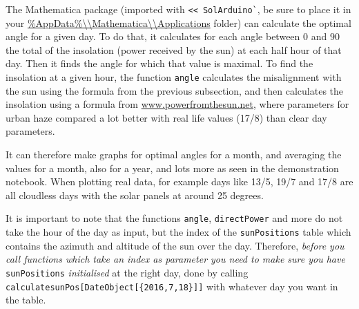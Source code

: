 \documentclass{article}
\begin{document}
			   The Mathematica package (imported with \verb|<< SolArduino`|, be sure to place it in your
			    \url{\%AppData\%\\Mathematica\\Applications} folder) can calculate the optimal angle for a given day.
			    To do that, it calculates for each angle between $0$ and $90$ the total of the insolation (power received by the sun) at each half hour of that day.
			    Then it finds the angle for which that value is maximal.
			    To find the insolation at a given hour, the function \verb|angle| calculates the misalignment with the sun using the formula from the previous subsection, and then calculates the insolation using a formula from \href{http://www.powerfromthesun.net/Book/chapter02/chapter02.html#ZEqnNum929295 }{www.powerfromthesun.net}, where parameters for urban haze compared a lot better with real life values (17/8) than clear day parameters.
			   
			   It can therefore make graphs for optimal angles for a month, and averaging the values for a month, also for a year, and lots more as seen in the demonstration notebook.
			   When plotting real data, for example days like  13/5, 19/7 and 17/8 are all cloudless days with the solar panels at around 25 degrees.
			   
			   It is important to note that the functions \verb|angle|, \verb|directPower| and more do not take the hour of the day as input, but the index of the \verb|sunPositions| table which contains the azimuth and altitude of the sun over the day.
			   Therefore, \textit{before you call functions which take an index as parameter you need to make sure you have }\verb|sunPositions| \textit{initialised} at the right day, done by calling \verb|calculatesunPos[DateObject[{2016,7,18}]]| with whatever day you want in the table.
			   	
\end{document}
